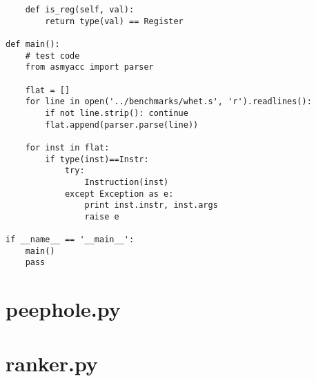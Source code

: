 \begin{lstlisting}
    def is_reg(self, val):
        return type(val) == Register 

def main():
    # test code
    from asmyacc import parser

    flat = []
    for line in open('../benchmarks/whet.s', 'r').readlines():
        if not line.strip(): continue
        flat.append(parser.parse(line))
        
    for inst in flat:
        if type(inst)==Instr:
            try:
                Instruction(inst)
            except Exception as e:
                print inst.instr, inst.args
                raise e
            
if __name__ == '__main__':
    main()
    pass
\end{lstlisting}

\newpage
\section{peephole.py}


\newpage
\section{ranker.py}


\newpage
